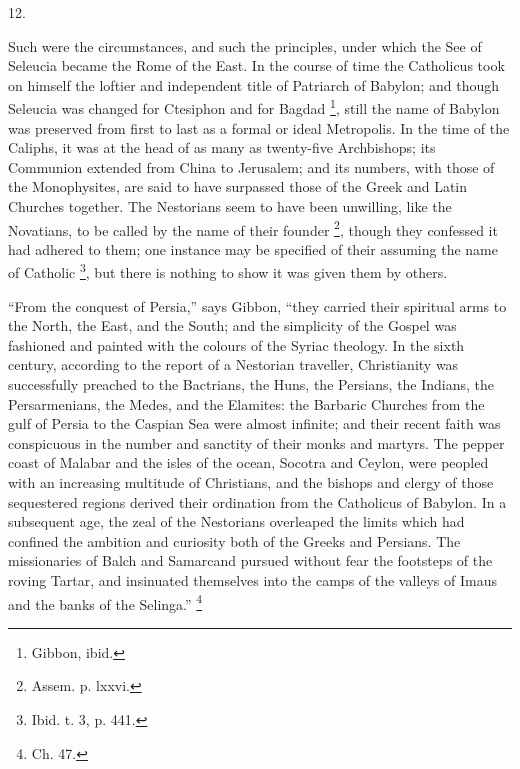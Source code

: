 12.

Such were the circumstances, and such the principles, under which
the See of Seleucia became the Rome of the East. In the course of time
the Catholicus took on himself the loftier and independent title of
Patriarch of Babylon; and though Seleucia was changed for Ctesiphon and
for Bagdad \footnote{Gibbon, ibid.}, still the
name of Babylon was preserved from first to last as a formal or ideal
Metropolis. In the time of the Caliphs, it was at the head of as many
as twenty-five Archbishops; its Communion extended from China to
Jerusalem; and its numbers, with those of the Monophysites, are said
to have surpassed those of the Greek and Latin Churches together. The
Nestorians seem to have been unwilling, like the Novatians, to be
called by the name of their founder \footnote{Assem. p. lxxvi.}, though they confessed it had adhered to them; one instance
may be specified of their assuming the name of Catholic \footnote{Ibid. t. 3, p. 441.}, but there is nothing to show it was given them by others.

``From the conquest of Persia,'' says Gibbon, ``they
carried their spiritual arms to the North, the East, and the South;
and the simplicity of the Gospel was fashioned and painted with the
colours of the Syriac theology. In the sixth century, according to the
report of a Nestorian traveller, Christianity was successfully
preached to the Bactrians, the Huns, the Persians, the Indians, the
Persarmenians, the Medes, and the Elamites: the Barbaric Churches from
the gulf of Persia to the Caspian Sea were almost infinite; and their
recent faith was conspicuous in the number and sanctity of their monks
and martyrs. The pepper coast of Malabar and the isles of the ocean,
Socotra and Ceylon, were peopled with an increasing multitude of
Christians, and the bishops and clergy of those sequestered regions
derived their ordination from the Catholicus of Babylon. In a
subsequent age, the zeal of the Nestorians overleaped the limits which
had confined the ambition and curiosity both of the Greeks and
Persians. The missionaries of Balch and Samarcand pursued without fear
the footsteps of the roving Tartar, and insinuated themselves into the
camps of the valleys of Imaus and the banks of the Selinga.'' \footnote{Ch. 47.}


